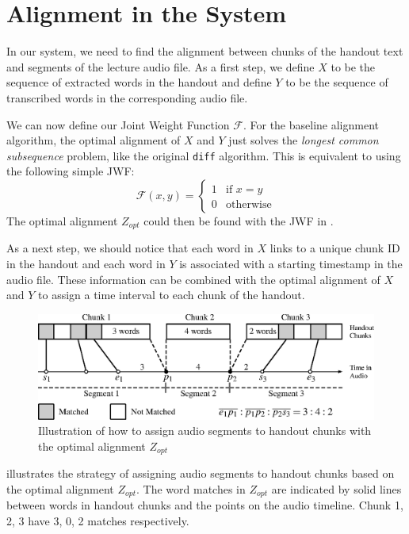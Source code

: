 \section{Alignment in the System}
\label{sec:align-in-system}

In our system, we need to find the alignment between chunks of the handout text and segments of the lecture audio file. As a first step, we define $X$ to be the sequence of extracted words in the handout and define $Y$ to be the sequence of transcribed words in the corresponding audio file.

We can now define our Joint Weight Function $\mathcal{F}$. For the baseline alignment algorithm, the optimal alignment of $X$ and $Y$ just solves the \textit{longest common subsequence} problem, like the original \texttt{diff} algorithm. This is equivalent to using the following simple JWF:
\begin{equation}
  \mathcal{F}(x,y) = 
  \begin{cases}
    1 & \text{if } x = y\\
    0 & \text{otherwise}
  \end{cases}
  \label{eq:jwf-baseline}
\end{equation}
The optimal alignment $Z_{opt}$ could then be found with the JWF in .

As a next step, we should notice that each word in $X$ links to a unique chunk ID in the handout and each word in $Y$ is associated with a starting timestamp in the audio file. These information can be combined with the optimal alignment of $X$ and $Y$ to assign a time interval to each chunk of the handout.

\begin{figure}[!tb]
  \centering
  \includegraphics[width=.9\textwidth]{align-algo-fig.eps}
  \caption{Illustration of how to assign audio segments to handout chunks with the optimal alignment $Z_{opt}$}
  \label{fig:align-algo-fig}
\end{figure}

 illustrates the strategy of assigning audio segments to handout chunks based on the optimal alignment $Z_{opt}$. The word matches in $Z_{opt}$ are indicated by solid lines between words in handout chunks and the points on the audio timeline. Chunk 1, 2, 3 have 3, 0, 2 matches respectively.

